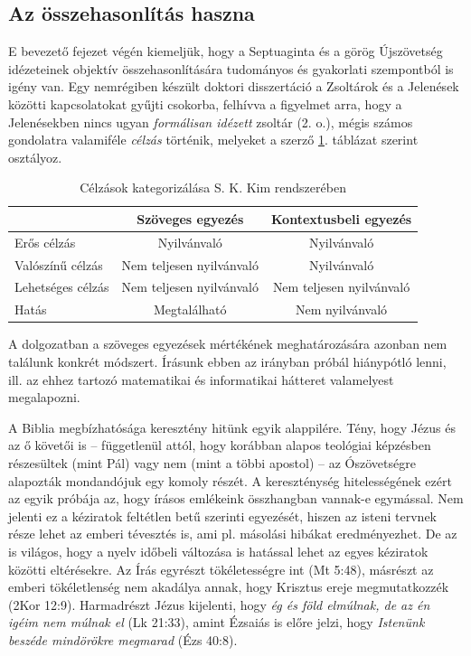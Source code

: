 \documentclass{article}
\begin{document}
\subsection{Az összehasonlítás haszna}

E bevezető fejezet végén kiemeljük, hogy a Septuaginta és a görög Újszövetség idézeteinek
objektív összehasonlítására tudományos és gyakorlati szempontból is igény van. Egy nemrégiben
készült doktori disszertáció \cite{SungKukKim} a Zsoltárok és a Jelenések közötti
kapcsolatokat gyűjti csokorba, felhívva a figyelmet arra, hogy a Jelenésekben nincs ugyan
\textit{formálisan idézett} zsoltár (2. o.), mégis számos gondolatra valamiféle
\textit{célzás} történik, melyeket a szerző \ref{celzas}. táblázat szerint osztályoz.
\begin{table}
\begin{tabular}{l | c | c}
& Szöveges egyezés & Kontextusbeli egyezés \\
\hline
Erős célzás & Nyilvánvaló & Nyilvánvaló\\
Valószínű célzás & Nem teljesen nyilvánvaló & Nyilvánvaló\\
Lehetséges célzás & Nem teljesen nyilvánvaló & Nem teljesen nyilvánvaló\\
Hatás & Megtalálható & Nem nyilvánvaló
\end{tabular}
\caption{Célzások kategorizálása S. K. Kim rendszerében}
\label{celzas}
\end{table}
A dolgozatban a szöveges egyezések mértékének meghatározására azonban nem találunk konkrét módszert.
Írásunk ebben az irányban próbál hiánypótló lenni, ill. az ehhez tartozó matematikai
és informatikai hátteret valamelyest megalapozni.

A Biblia megbízhatósága keresztény hitünk egyik alappilére. Tény, hogy Jézus és az ő követői is --
függetlenül attól, hogy korábban alapos teológiai képzésben részesültek (mint Pál) vagy nem
(mint a többi apostol) -- az Ószövetségre alapozták mondandójuk egy komoly részét.
A kereszténység hitelességének ezért az egyik próbája az, hogy írásos emlékeink összhangban
vannak-e egymással. Nem jelenti ez a kéziratok feltétlen betű szerinti egyezését, hiszen az isteni
tervnek része lehet az emberi tévesztés is, ami pl. másolási hibákat eredményezhet. De az is világos, hogy
a nyelv időbeli változása is hatással lehet az egyes kéziratok közötti eltérésekre. Az Írás
egyrészt tökéletességre int (Mt 5:48),
másrészt az emberi tökéletlenség nem akadálya annak, hogy Krisztus ereje megmutatkozzék
(2Kor 12:9). Harmadrészt Jézus kijelenti, hogy \textit{ég és föld elmúlnak, de az én igéim
nem múlnak el} (Lk 21:33), amint Ézsaiás is előre jelzi, hogy \textit{Istenünk beszéde
mindörökre megmarad} (Ézs 40:8).
\end{document}
